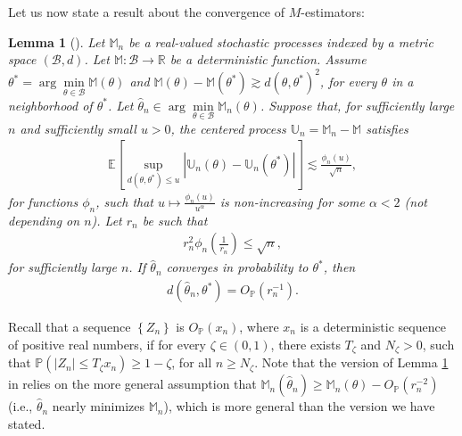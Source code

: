 \documentclass{article}
\newtheorem{lemma}{Lemma}
\begin{document}
Let us now state a result about the convergence of $M$-estimators:
\begin{lemma}[\cite{Weak_Conv_Van_Der}]
\label{lemma:M_Estim_Conv}
Let $\mathbb{M}_n$ be a real-valued stochastic processes indexed by a metric space $\left(\mathcal{B}, d\right)$. Let $\mathbb{M} : \mathcal{B} \rightarrow \mathbb{R}$ be a deterministic function. Assume $\theta^* = \arg\min\limits_{\theta \in \mathcal{B}}\mathbb{M(\theta)}$ and $\mathbb{M}(\theta) - \mathbb{M}(\theta^*) \gtrsim d(\theta, \theta^*)^2$, for every $\theta$ in a neighborhood of $\theta^*$. Let $\widehat{\theta}_n \in \arg\min\limits_{\theta \in \mathcal{B}}\mathbb{M}_n(\theta)$. Suppose that, for sufficiently large $n$ and sufficiently small $u > 0$, the centered process $\mathbb{U}_n = \mathbb{M}_n - \mathbb{M}$ satisfies
\begin{align*}
\mathbb{E}\left[\mathop{\sup}\limits_{d(\theta, \theta^*) \leq u}\left|\mathbb{U}_n(\theta) - \mathbb{U}_n(\theta^*)\right|\right] \lesssim \frac{\phi_n(u)}{\sqrt{n}},
\end{align*}
for functions $\phi_n$, such that $u \mapsto \frac{\phi_n(u)}{u^{\alpha}}$ is non-increasing for some $\alpha < 2$ (not depending on $n$). Let $r_n$ be such that 
\begin{align*}
r_n^2\phi_n\left(\frac{1}{r_n}\right) \leq \sqrt{n},
\end{align*}
for sufficiently large $n$. If $\widehat{\theta}_n$ converges in probability to $\theta^*$, then 
\begin{align*}
d(\widehat{\theta}_n, \theta^*) = O_{\mathbb{P}}(r_n^{-1}).
\end{align*}
\end{lemma}
Recall that a sequence $\left\{Z_n\right\}$ is $O_{\mathbb{P}}(x_n)$, where $x_n$ is a deterministic sequence of positive real numbers, if for every $\zeta \in (0, 1)$, there exists $T_\zeta$ and $N_\zeta > 0$, such that $\mathbb{P}\left(|Z_n| \leq T_\zeta x_n\right) \geq 1 - \zeta$, for all $n \geq N_\zeta$. Note that the version of Lemma \ref{lemma:M_Estim_Conv} in \cite{Weak_Conv_Van_Der} relies on the more general assumption that $\mathbb{M}_n(\widehat{\theta}_n) \geq \mathbb{M}_n(\theta) - O_{\mathbb{P}}\left(r_n^{-2}\right)$ (i.e., $\widehat{\theta}_n$ nearly minimizes $\mathbb{M}_n$), which is more general than the version we have stated. %
\end{document}
